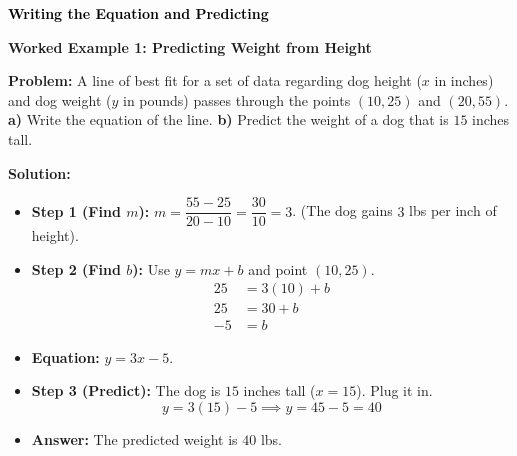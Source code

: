 \documentclass[12pt, letterpaper, fleqn]{article}
\begin{document}
\begin{tcolorbox}[colback=customteal!20]
\large\textcolor{black}{\textbf{Writing the Equation and Predicting}}
\end{tcolorbox}

\vspace{3mm}

\begin{tcolorbox}[colback=white, colframe=black!25, boxrule=0.6pt, arc=4mm, left=6mm, right=6mm, top=5mm, bottom=5mm]

\textbf{Worked Example 1: Predicting Weight from Height}

\medskip

\textbf{Problem:} A line of best fit for a set of data regarding dog height ($x$ in inches) and dog weight ($y$ in pounds) passes through the points $(10, 25)$ and $(20, 55)$. 
\textbf{a)} Write the equation of the line.
\textbf{b)} Predict the weight of a dog that is $15$ inches tall.

\medskip

\textbf{Solution:}
\begin{itemize}
    \item \textbf{Step 1 (Find $m$):} $m = \dfrac{55 - 25}{20 - 10} = \dfrac{30}{10} = 3$. (The dog gains $3$ lbs per inch of height).
    \item \textbf{Step 2 (Find $b$):} Use $y = mx + b$ and point $(10, 25)$.
    \begin{align*}
        25 &= 3(10) + b \\
        25 &= 30 + b \\
        -5 &= b
    \end{align*}
    \item \textbf{Equation:} $y = 3x - 5$.
    \item \textbf{Step 3 (Predict):} The dog is $15$ inches tall ($x = 15$). Plug it in.
    \[ y = 3(15) - 5 \implies y = 45 - 5 = 40 \]
    \item \textbf{Answer:} The predicted weight is $40$ lbs.
\end{itemize}

\end{tcolorbox}

\vspace{4mm}
\end{document}
